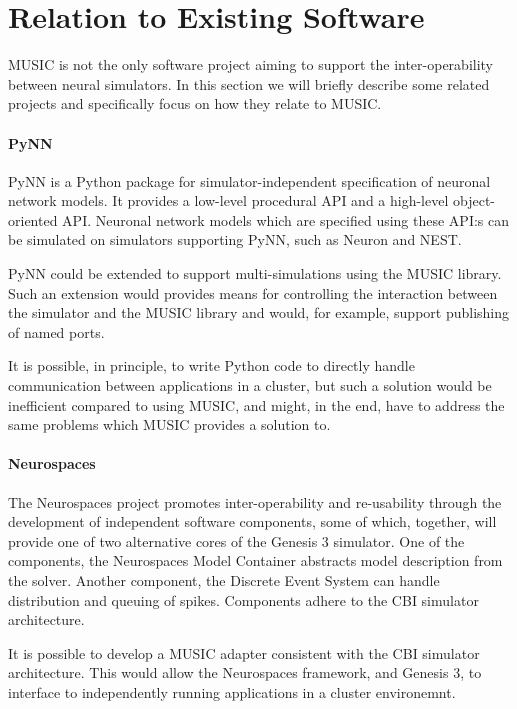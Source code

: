 \documentclass[a4paper]{report}
\begin{document}
\section{Relation to Existing Software}

MUSIC is not the only software project aiming to support the
inter-operability between neural simulators.  In this section we will
briefly describe some related projects and specifically focus on how
they relate to MUSIC.

\paragraph{PyNN}

PyNN is a Python package for simulator-independent specification of
neuronal network models.  It provides a low-level procedural API and a
high-level object-oriented API.  Neuronal network models which are
specified using these API:s can be simulated on simulators supporting
PyNN, such as Neuron and NEST.

PyNN could be extended to support multi-simulations using the MUSIC
library.  Such an extension would provides means for controlling the
interaction between the simulator and the MUSIC library and would, for
example, support publishing of named ports.

It is possible, in principle, to write Python code to directly handle
communication between applications in a cluster, but such a solution
would be inefficient compared to using MUSIC, and might, in the end,
have to address the same problems which MUSIC provides a solution to.

\paragraph{Neurospaces}

The Neurospaces project promotes inter-operability and re-usability
through the development of independent software components, some of
which, together, will provide one of two alternative cores of the
Genesis 3 simulator.  One of the components, the Neurospaces Model
Container abstracts model description from the solver.  Another
component, the Discrete Event System can handle distribution and
queuing of spikes.  Components adhere to the CBI simulator
architecture.

It is possible to develop a MUSIC adapter consistent with the CBI
simulator architecture.  This would allow the Neurospaces framework,
and Genesis 3, to interface to independently running applications in a
cluster environemnt.
\end{document}

